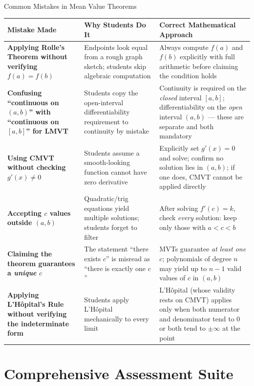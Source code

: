 \documentclass[12pt,a4paper]{article}
\begin{document}
\begin{mistakebox}{Common Mistakes in Mean Value Theorems}
\begin{tabular}{>{\bfseries}p{4.5cm} p{4.5cm} p{5.5cm}}
\toprule
Mistake Made & Why Students Do It & Correct Mathematical Approach \\
\midrule
Applying Rolle's Theorem without verifying $f(a)=f(b)$ &
  Endpoints look equal from a rough graph sketch; students skip algebraic computation &
  Always compute $f(a)$ and $f(b)$ explicitly with full arithmetic before claiming the condition holds \\
\addlinespace
Confusing ``continuous on $(a,b)$'' with ``continuous on $[a,b]$'' for LMVT &
  Students copy the open-interval differentiability requirement to continuity by mistake &
  Continuity is required on the \emph{closed} interval $[a,b]$; differentiability on the
  \emph{open} interval $(a,b)$ --- these are separate and both mandatory \\
\addlinespace
Using CMVT without checking $g'(x)\neq0$ &
  Students assume a smooth-looking function cannot have zero derivative &
  Explicitly set $g'(x)=0$ and solve; confirm no solution lies in $(a,b)$;
  if one does, CMVT cannot be applied directly \\
\addlinespace
Accepting $c$ values outside $(a,b)$ &
  Quadratic/trig equations yield multiple solutions; students forget to filter &
  After solving $f'(c)=k$, check \emph{every} solution: keep only those with $a < c < b$ \\
\addlinespace
Claiming the theorem guarantees a \emph{unique} $c$ &
  The statement ``there exists $c$'' is misread as ``there is exactly one $c$'' &
  MVTs guarantee \emph{at least one} $c$; polynomials of degree $n$ may yield up to $n-1$
  valid values of $c$ in $(a,b)$ \\
\addlinespace
Applying L'H\^{o}pital's Rule without verifying the indeterminate form &
  Students apply L'H\^{o}pital mechanically to every limit &
  L'H\^{o}pital (whose validity rests on CMVT) applies only when both numerator and
  denominator tend to $0$ or both tend to $\pm\infty$ at the point \\
\bottomrule
\end{tabular}
\end{mistakebox}

\section{Comprehensive Assessment Suite}
\end{document}
